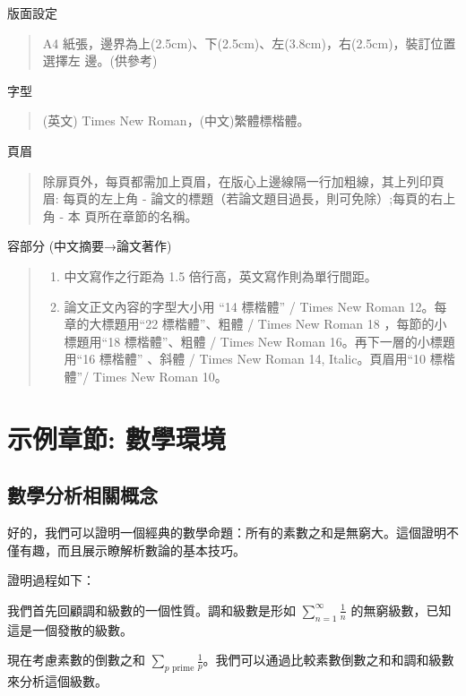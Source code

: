\documentclass[
    writingLanguage=chinese, %
    addPageTitle=on,  %
    addDeclaration=on, %
    addMUSTlogo=on, %
    addFigTOC=on, %
    addTabTOC=on, %
    refIndent=off, %
    printMod=off, %
]{.def/must}
\begin{document}
\noindent\faHandORight 版面設定
\begin{quote}
A4 紙張，邊界為上(2.5cm)、下(2.5cm)、左(3.8cm)，右(2.5cm)，裝訂位置選擇左
邊。(供參考)

\end{quote}

\noindent\faHandORight 字型
\begin{quote}
(英文) Times New Roman，(中文)繁體標楷體。
\end{quote}

\noindent\faHandORight 頁眉
\begin{quote}
除扉頁外，每頁都需加上頁眉，在版心上邊線隔一行加粗線，其上列印頁眉:
每頁的左上角 - 論文的標題（若論文題目過長，則可免除）;每頁的右上角 - 本
頁所在章節的名稱。
\end{quote}

\noindent\faHandORight 容部分 (中文摘要→論文著作)
\begin{quote}
\begin{enumerate}
    \item 中文寫作之行距為 1.5 倍行高，英文寫作則為單行間距。
    \item 論文正文內容的字型大小用 “14 標楷體” / Times New Roman 12。每章的大標題用“22 標楷體”、粗體 / Times New Roman 18 ，每節的小標題用“18 標楷體”、粗體 / Times New Roman 16。再下一層的小標題用“16 標楷體” 、斜體 / Times New Roman 14, Italic。頁眉用“10 標楷體”/ Times New Roman 10。
\end{enumerate}
\end{quote}



 



\chapter{示例章節: 數學環境}
\section{數學分析相關概念}
好的，我們可以證明一個經典的數學命題：所有的素數之和是無窮大。這個證明不僅有趣，而且展示瞭解析數論的基本技巧。

證明過程如下：

我們首先回顧調和級數的一個性質。調和級數是形如 \( \sum_{n=1}^{\infty} \frac{1}{n} \) 的無窮級數，已知這是一個發散的級數。

現在考慮素數的倒數之和 \( \sum_{p \text{ prime}} \frac{1}{p} \)。我們可以通過比較素數倒數之和和調和級數來分析這個級數。
\end{document}
